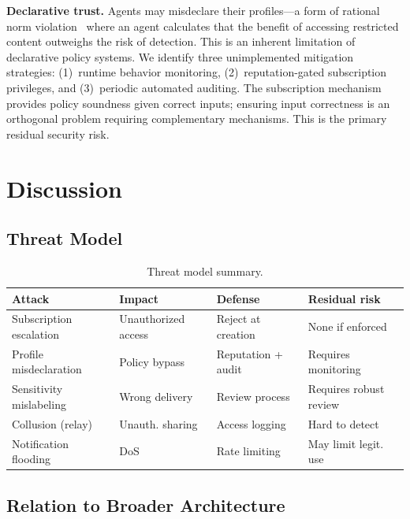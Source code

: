\documentclass[11pt]{article}
\begin{document}
\textbf{Declarative trust.} Agents may misdeclare their profiles---a form of rational norm violation~\cite{boella2004} where an agent calculates that the benefit of accessing restricted content outweighs the risk of detection. This is an inherent limitation of declarative policy systems. We identify three unimplemented mitigation strategies: (1)~runtime behavior monitoring, (2)~reputation-gated subscription privileges, and (3)~periodic automated auditing. The subscription mechanism provides policy soundness given correct inputs; ensuring input correctness is an orthogonal problem requiring complementary mechanisms. This is the primary residual security risk.

\section{Discussion}

\subsection{Threat Model}

\begin{table}[h]
\centering
\caption{Threat model summary.}
\label{tab:threats}
\small
\begin{tabular}{@{}p{2.2cm}p{2cm}p{2.2cm}p{2.2cm}@{}}
\toprule
Attack & Impact & Defense & Residual risk \\
\midrule
Subscription escalation & Unauthorized access & Reject at creation & None if enforced \\
Profile misdeclaration & Policy bypass & Reputation + audit & Requires monitoring \\
Sensitivity mislabeling & Wrong delivery & Review process & Requires robust review \\
Collusion (relay) & Unauth. sharing & Access logging & Hard to detect \\
Notification flooding & DoS & Rate limiting & May limit legit. use \\
\bottomrule
\end{tabular}
\end{table}

\subsection{Relation to Broader Architecture}
\end{document}
